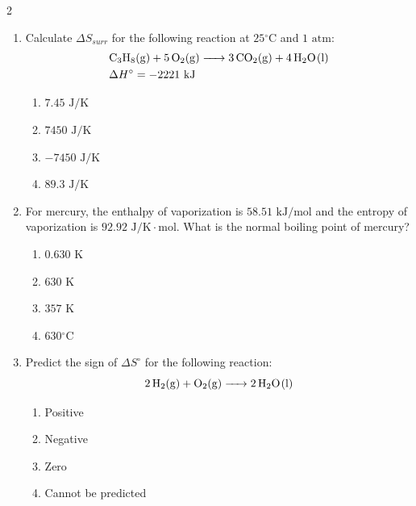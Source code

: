 \documentclass[12pt,letterpaper]{article}
\begin{document}
\begin{multicols*}{2}
\begin{enumerate}
        \item Calculate $\Delta S_{surr}$ for the following reaction at $25\text{}^\circ\text{C}$ and $1\text{ atm}$:
            \begin{align*}
                &\ce{C3H8(g) + 5O2(g) -> 3CO2(g) + 4H2O(l)}\\
                &\Delta H^\circ = -2221\text{ kJ}
            \end{align*}
            \begin{enumerate}
                \item $7.45\text{ J/K}$
                \item $7450\text{ J/K}$
                \item $-7450\text{ J/K}$
                \item $89.3\text{ J/K}$
            \end{enumerate}

        \item For mercury, the enthalpy of vaporization is $58.51\text{ kJ/mol}$ and the entropy of vaporization is $92.92\text{ J/K}\cdot\text{mol}$. What is the normal boiling point of mercury? %
            \begin{enumerate}
                \item $0.630\text{ K}$
                \item $630\text{ K}$
                \item $357\text{ K}$
                \item $630\text{}^\circ\text{C}$
            \end{enumerate}

        \item Predict the sign of $\Delta S^\circ$ for the following reaction:
            \begin{equation*}
                \ce{2H2(g) + O2(g) -> 2H2O(l)}
            \end{equation*}
            \begin{enumerate}
                \item Positive
                \item Negative
                \item Zero
                \item Cannot be predicted
            \end{enumerate}


\end{enumerate}
\end{multicols*}
\end{document}
